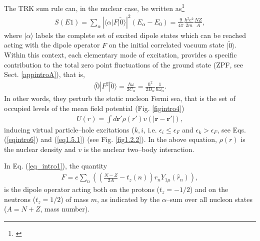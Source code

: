 The TRK sum rule can, in the nuclear case, be written as\footnote{\cite{Bohr:75,Bertsch:05,Bortignon:98}}
\begin{align}\label{eq_intro1}
S(E1)=\sum_\alpha\left|\langle\alpha|F|\tilde 0\rangle\right|^2(E_\alpha-E_0)=\frac{9}{4\pi}\frac{\hbar^2e^2}{2m}\frac{NZ}{A},
\end{align}
where $|\alpha\rangle$ labels the complete set of excited dipole states which can be reached acting with the dipole operator $F$ on the initial correlated vacuum state $|\tilde 0\rangle$. Within this context, each elementary mode of excitation, provides a specific contribution to the total zero point fluctuations of the ground state (ZPF, see Sect. \ref{appintroA}), that is,
\begin{align}\label{eqintro2}
\langle\tilde 0|F^2|\tilde 0\rangle=\frac{\hbar \omega}{2C_\alpha}=\frac{\hbar^2}{2D_\alpha}\frac{1}{\hbar\omega_\alpha}.
\end{align}
In other words, they perturb the static nucleon Fermi sea, that is the set of occupied levels of the mean field potential (Fig. \ref{figintro4})
\begin{align}\label{eqintro3}
U(r)=\int d\mathbf r' \rho(r')v(|\mathbf r-\mathbf r'|),
\end{align}
inducing virtual particle--hole excitations ($k,i$, i.e. $\epsilon_i\leq\epsilon_F$ and $\epsilon_k>\epsilon_F$, see Eqs. (\ref{eqintro6}) and (\ref{eq1.5.1}) (see Fig. \ref{fig1.2.2}). In the above equation, $\rho(r)$ is the nuclear density and $v$ is the nuclear two--body interaction.  


In Eq. (\ref{eq_intro1}), the quantity 
\begin{align}
F=e\sum_n\left(\left(\frac{N-Z}{2A}-t_z(n)\right)r_nY_{1\mu}(\hat r_n)\right),
\end{align}
is the dipole operator acting both on the  protons ($t_z=-1/2$) and on the neutrons ($t_z=1/2$) of mass $m$, as indicated by the $\alpha$--sum over all nucleon states ($A=N+Z$, mass number).

